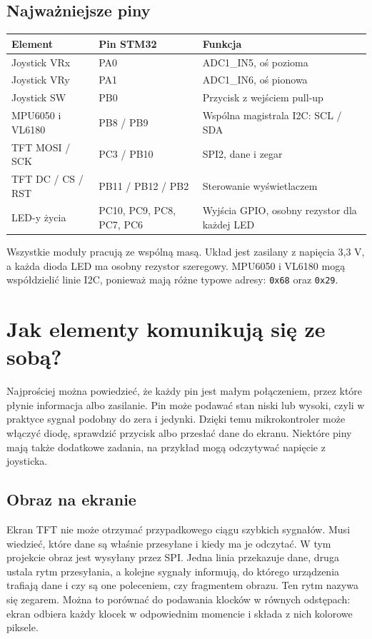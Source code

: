 \documentclass[12pt,a4paper]{article}
\newcommand{\sectiontitle}[1]{%
    \section*{#1}
}
\begin{document}
\subsection*{Najważniejsze piny}

\begin{tabularx}{\textwidth}{@{}l l X@{}}
\toprule
\textbf{Element} & \textbf{Pin STM32} & \textbf{Funkcja} \\
\midrule
Joystick VRx & PA0 & ADC1\_IN5, oś pozioma \\
Joystick VRy & PA1 & ADC1\_IN6, oś pionowa \\
Joystick SW & PB0 & Przycisk z wejściem pull-up \\
MPU6050 i VL6180 & PB8 / PB9 & Wspólna magistrala I2C: SCL / SDA \\
TFT MOSI / SCK & PC3 / PB10 & SPI2, dane i zegar \\
TFT DC / CS / RST & PB11 / PB12 / PB2 & Sterowanie wyświetlaczem \\
LED-y życia & PC10, PC9, PC8, PC7, PC6 & Wyjścia GPIO, osobny rezystor dla każdej LED \\
\bottomrule
\end{tabularx}

Wszystkie moduły pracują ze wspólną masą. Układ jest zasilany z napięcia
3,3 V, a każda dioda LED ma osobny rezystor szeregowy. MPU6050 i VL6180
mogą współdzielić linie I2C, ponieważ mają różne typowe adresy:
\texttt{0x68} oraz \texttt{0x29}.

\sectiontitle{Jak elementy komunikują się ze sobą?}

Najprościej można powiedzieć, że każdy pin jest małym połączeniem, przez
które płynie informacja albo zasilanie. Pin może podawać stan niski lub
wysoki, czyli w praktyce sygnał podobny do zera i jedynki. Dzięki temu
mikrokontroler może włączyć diodę, sprawdzić przycisk albo przesłać dane
do ekranu. Niektóre piny mają także dodatkowe zadania, na przykład mogą
odczytywać napięcie z joysticka.

\subsection*{Obraz na ekranie}

Ekran TFT nie może otrzymać przypadkowego ciągu szybkich sygnałów. Musi
wiedzieć, które dane są właśnie przesyłane i kiedy ma je odczytać. W tym
projekcie obraz jest wysyłany przez SPI. Jedna linia przekazuje dane, druga
ustala rytm przesyłania, a kolejne sygnały informują, do którego urządzenia
trafiają dane i czy są one poleceniem, czy fragmentem obrazu. Ten rytm
nazywa się zegarem. Można to porównać do podawania klocków w równych
odstępach: ekran odbiera każdy klocek w odpowiednim momencie i składa z nich
kolorowe piksele.
\end{document}
